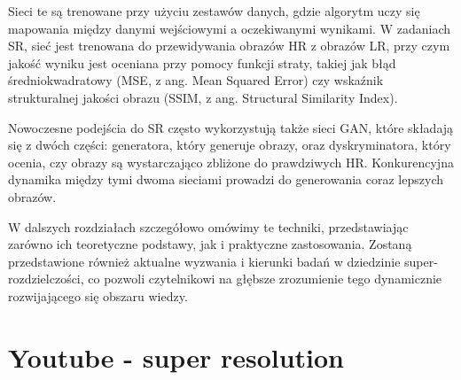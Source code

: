 Sieci te są trenowane przy użyciu zestawów danych, gdzie algorytm uczy się mapowania między danymi wejściowymi a oczekiwanymi wynikami. W zadaniach SR, sieć jest trenowana do przewidywania obrazów HR z obrazów LR, przy czym jakość wyniku jest oceniana przy pomocy funkcji straty, takiej jak błąd średniokwadratowy (MSE, z ang. Mean Squared Error) czy wskaźnik strukturalnej jakości obrazu (SSIM, z ang. Structural Similarity Index).

Nowoczesne podejścia do SR często wykorzystują także sieci GAN, które składają się z dwóch części: generatora, który generuje obrazy, oraz dyskryminatora, który ocenia, czy obrazy są wystarczająco zbliżone do prawdziwych HR. Konkurencyjna dynamika między tymi dwoma sieciami prowadzi do generowania coraz lepszych obrazów.

W dalszych rozdziałach szczegółowo omówimy te techniki, przedstawiając zarówno ich teoretyczne podstawy, jak i praktyczne zastosowania. Zostaną przedstawione również aktualne wyzwania i kierunki badań w dziedzinie super-rozdzielczości, co pozwoli czytelnikowi na głębsze zrozumienie tego dynamicznie rozwijającego się obszaru wiedzy.

\section*{Youtube - super resolution}


